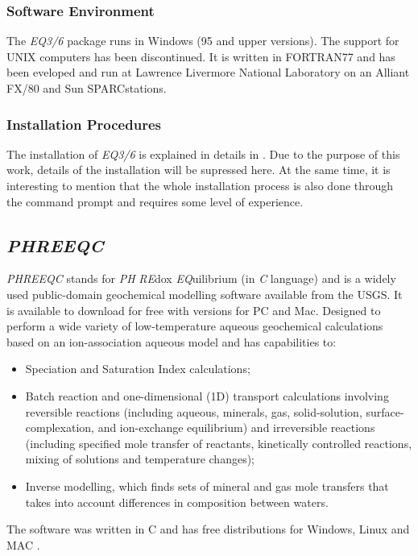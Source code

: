\documentclass[ppgc,mestrado,english]{iiufrgs}
\begin{document}
\subsubsection{Software Environment}
The \emph{EQ3/6} package runs in Windows (95 and upper versions). The support for UNIX computers has been discontinued.  It is written in FORTRAN77 and has been eveloped and run at Lawrence Livermore National Laboratory on an Alliant FX/80 and Sun SPARCstations. 
\subsubsection{Installation Procedures}
The installation of \emph{EQ3/6} is explained in details in \cite{Wolery:92}. Due to the purpose of this work, details of the installation will be supressed here. At the same time, it is interesting to mention that the whole installation process is also done through the command prompt and requires some level of experience. 

\subsection{\emph{PHREEQC}}
\emph{PHREEQC} stands for \emph{PH} \emph{RE}dox \emph{EQ}uilibrium (in \emph{C} language) and is a widely used public-domain geochemical modelling software available from the USGS. It is available to download for free with versions for PC and Mac. Designed to perform a wide variety of low-temperature aqueous geochemical calculations based on an ion-association aqueous model and has capabilities to:
\begin{itemize}
\item Speciation and Saturation Index calculations;
\item Batch reaction and one-dimensional (1D) transport calculations involving reversible reactions (including aqueous, minerals, gas, solid-solution, surface-complexation, and ion-exchange equilibrium) and irreversible reactions (including specified mole transfer of reactants, kinetically controlled reactions, mixing of solutions and temperature changes);
\item Inverse modelling, which finds sets of mineral and gas mole transfers that takes into account differences in composition between waters.
\end{itemize}
The software was written in C and has free distributions for Windows, Linux and MAC \cite{Parkhurst:80}.
\end{document}
